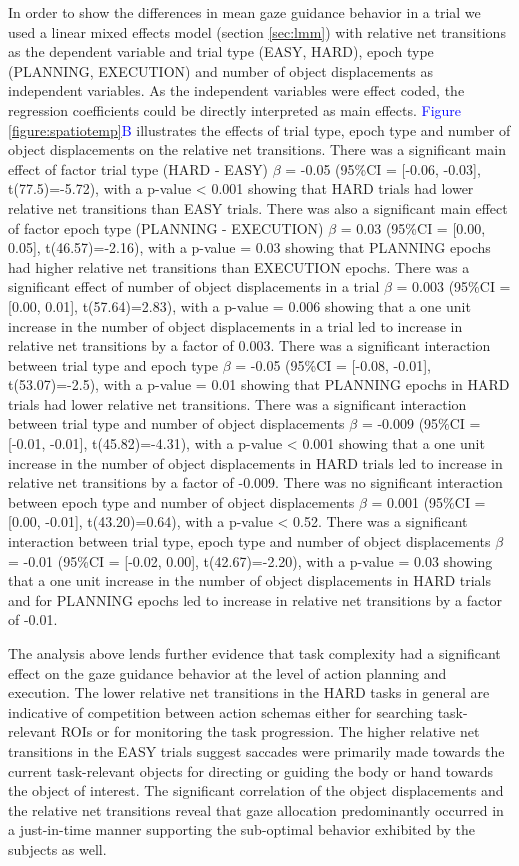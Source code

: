 In order to show the differences in mean gaze guidance behavior in a trial we used a linear mixed effects model (section \ref{sec:lmm}) with relative net transitions as the dependent variable and trial type (EASY, HARD), epoch type (PLANNING, EXECUTION) and number of object displacements as independent variables. As the independent variables were effect coded, the regression coefficients could be directly interpreted as main effects. \textcolor{Blue}{Figure \ref{figure:spatiotemp}B} illustrates the effects of trial type, epoch type and number of object displacements on the relative net transitions. There was a significant main effect of factor trial type (HARD - EASY) $\beta$ = -0.05 (95\%CI = [-0.06, -0.03], t(77.5)=-5.72), with a p-value < 0.001 showing that HARD trials had lower relative net transitions than EASY trials. There was also a significant main effect of factor epoch type (PLANNING - EXECUTION) $\beta$ = 0.03 (95\%CI = [0.00, 0.05], t(46.57)=-2.16), with a p-value = 0.03 showing that PLANNING epochs had higher relative net transitions than EXECUTION epochs. There was a significant effect of number of object displacements in a trial $\beta$ = 0.003 (95\%CI = [0.00, 0.01], t(57.64)=2.83), with a p-value = 0.006 showing that a one unit increase in the number of object displacements in a trial led to increase in relative net transitions by a factor of 0.003. There was a significant interaction between trial type and epoch type $\beta$ = -0.05 (95\%CI = [-0.08, -0.01], t(53.07)=-2.5), with a p-value = 0.01 showing that PLANNING epochs in HARD trials had lower relative net transitions. There was a significant interaction between trial type and number of object displacements $\beta$ = -0.009 (95\%CI = [-0.01, -0.01], t(45.82)=-4.31), with a p-value < 0.001 showing that a one unit increase in the number of object displacements in HARD trials led to increase in relative net transitions by a factor of -0.009. There was no significant interaction between epoch type and number of object displacements $\beta$ = 0.001 (95\%CI = [0.00, -0.01], t(43.20)=0.64), with a p-value < 0.52. There was a significant interaction between trial type, epoch type and number of object displacements $\beta$ = -0.01 (95\%CI = [-0.02, 0.00], t(42.67)=-2.20), with a p-value = 0.03 showing that a one unit increase in the number of object displacements in HARD trials and for PLANNING epochs led to increase in relative net transitions by a factor of -0.01.

The analysis above lends further evidence that task complexity had a significant effect on the gaze guidance behavior at the level of action planning and execution. The lower relative net transitions in the HARD tasks in general are indicative of competition between action schemas either for searching task-relevant ROIs or for monitoring the task progression. The higher relative net transitions in the EASY trials suggest saccades were primarily made towards the current task-relevant objects for directing or guiding the body or hand towards the object of interest. The significant correlation of the object displacements and the relative net transitions reveal that gaze allocation predominantly occurred in a just-in-time manner supporting the sub-optimal behavior exhibited by the subjects as well.


